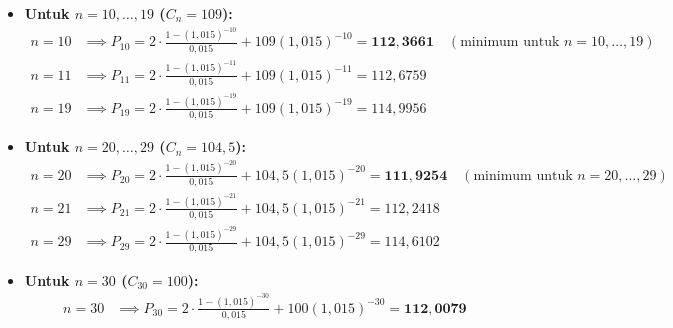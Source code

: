 \documentclass[10.5pt,a4paper]{article}
\begin{document}
\begin{itemize}
    \item \textbf{Untuk $n = 10, \dots, 19$ ($C_n = 109$):}
    \begin{align*}
        n = 10 &\implies P_{10} = 2 \cdot \frac{1 - (1{,}015)^{-10}}{0{,}015} + 109(1{,}015)^{-10} = \mathbf{112{,}3661} \quad (\text{minimum untuk } n = 10,\dots,19) \\
        n = 11 &\implies P_{11} = 2 \cdot \frac{1 - (1{,}015)^{-11}}{0{,}015} + 109(1{,}015)^{-11} = 112{,}6759 \\
        n = 19 &\implies P_{19} = 2 \cdot \frac{1 - (1{,}015)^{-19}}{0{,}015} + 109(1{,}015)^{-19} = 114{,}9956
    \end{align*}

    \item \textbf{Untuk $n = 20, \dots, 29$ ($C_n = 104{,}5$):}
    \begin{align*}
        n = 20 &\implies P_{20} = 2 \cdot \frac{1 - (1{,}015)^{-20}}{0{,}015} + 104{,}5(1{,}015)^{-20} = \mathbf{111{,}9254} \quad (\text{minimum untuk } n = 20,\dots,29) \\
        n = 21 &\implies P_{21} = 2 \cdot \frac{1 - (1{,}015)^{-21}}{0{,}015} + 104{,}5(1{,}015)^{-21} = 112{,}2418 \\
        n = 29 &\implies P_{29} = 2 \cdot \frac{1 - (1{,}015)^{-29}}{0{,}015} + 104{,}5(1{,}015)^{-29} = 114{,}6102
    \end{align*}

    \item \textbf{Untuk $n = 30$ ($C_{30} = 100$):}
    \begin{align*}
        n = 30 &\implies P_{30} = 2 \cdot \frac{1 - (1{,}015)^{-30}}{0{,}015} + 100(1{,}015)^{-30} = \mathbf{112{,}0079}
    \end{align*}
\end{itemize}
\end{document}
